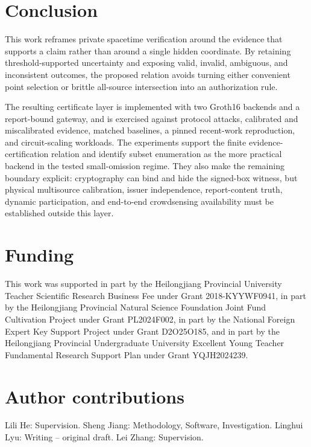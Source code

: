 \documentclass[preprint,review,12pt]{elsarticle}
\begin{document}
\section{Conclusion}
This work reframes private spacetime verification around the evidence that supports a claim rather than around a single hidden coordinate. By retaining threshold-supported uncertainty and exposing valid, invalid, ambiguous, and inconsistent outcomes, the proposed relation avoids turning either convenient point selection or brittle all-source intersection into an authorization rule.

The resulting certificate layer is implemented with two Groth16 backends and a report-bound gateway, and is exercised against protocol attacks, calibrated and miscalibrated evidence, matched baselines, a pinned recent-work reproduction, and circuit-scaling workloads. The experiments support the finite evidence-certification relation and identify subset enumeration as the more practical backend in the tested small-omission regime. They also make the remaining boundary explicit: cryptography can bind and hide the signed-box witness, but physical multisource calibration, issuer independence, report-content truth, dynamic participation, and end-to-end crowdsensing availability must be established outside this layer.
\section*{Funding}
\begingroup\raggedright
This work was supported in part by the Heilongjiang Provincial University Teacher Scientific Research Business Fee under Grant 2018-KYYWF0941, in part by the Heilongjiang Provincial Natural Science Foundation Joint Fund Cultivation Project under Grant PL2024F002, in part by the National Foreign Expert Key Support Project under Grant D2O25O185, and in part by the Heilongjiang Provincial Undergraduate University Excellent Young Teacher Fundamental Research Support Plan under Grant YQJH2024239.

\par\endgroup
\section*{Author contributions}
Lili He: Supervision. Sheng Jiang: Methodology, Software, Investigation. Linghui Lyu: Writing -- original draft. Lei Zhang: Supervision.
\end{document}
